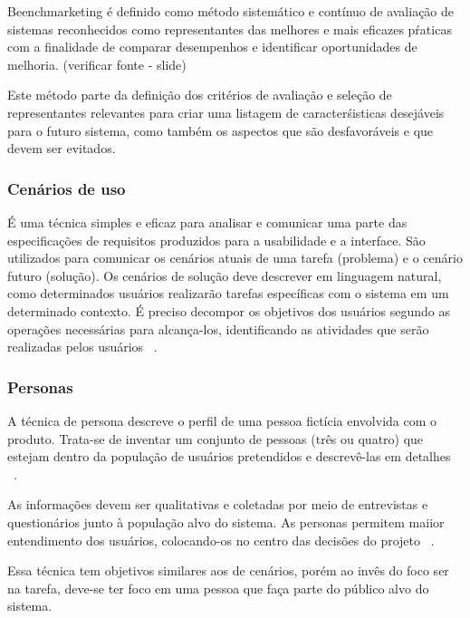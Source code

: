 	Beenchmarketing é definido como método sistemático e contínuo de avaliação de sistemas reconhecidos como representantes das melhores e mais eficazes pŕaticas com a finalidade de comparar desempenhos e identificar oportunidades de melhoria. (verificar fonte - slide)

	Este método parte da definição dos critérios de avaliação e seleção de representantes relevantes para criar uma listagem de caracterśisticas desejáveis para o futuro sistema, como também os aspectos que são desfavoráveis e que devem ser evitados.

\subsubsection{Cenários de uso}

	É uma técnica simples e eficaz para analisar e comunicar uma parte das especificações de requisitos produzidos para a usabilidade e a interface. São utilizados para comunicar os cenários atuais de uma tarefa (problema) e o cenário futuro (solução). Os cenários de solução deve descrever em linguagem natural, como determinados usuários realizarão tarefas específicas com o sistema em um determinado contexto. É preciso decompor os objetivos dos usuários segundo as operações necessárias para alcança-los, identificando as atividades que serão realizadas pelos usuários ~\cite{cybis2010}.

\subsubsection{Personas}

	A técnica de persona descreve o perfil de uma pessoa fictícia envolvida com o produto. Trata-se de inventar um conjunto de pessoas (três ou quatro) que estejam dentro da população de usuários pretendidos e descrevê-las em detalhes ~\cite{cybis2010}.

	As informações devem ser qualitativas e coletadas por meio de entrevistas e questionários junto à população alvo do sistema. As personas permitem maiior entendimento dos usuários, colocando-os no centro das decisões do projeto ~\cite{cybis2010}.

	Essa técnica tem objetivos similares aos de cenários, porém ao invês do foco ser na tarefa, deve-se ter foco em uma pessoa que faça parte do público alvo do sistema.



